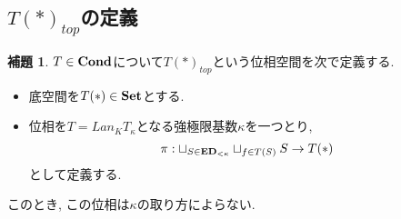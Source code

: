 \documentclass[dvipdfmx,a4paper,11pt]{report}
\theoremstyle{definition}
\newtheorem{lem}[thm]{補題}
\begin{document}
\subsection{$T(\ast)_{top}$の定義}
 \begin{tcolorbox}
 [colback = white, colframe = green!35!black, fonttitle = \bfseries,breakable = true]
\begin{lem} \cite{Sch19}
$T \in {\bf Cond}$について$T(\ast)_{top}$という位相空間を次で定義する.
\begin{itemize}
\item 底空間を$T(\ast) \in {\bf Set}$とする. 
\item 位相を$T = Lan_{K}T_{\kappa}$となる強極限基数$\kappa$を一つとり, 
$$
\pi : \sqcup_{S \in {\bf ED}_{<\kappa}}  \sqcup_{f \in T(S) }  S \to T(\ast)
$$
として定義する.
\end{itemize}
このとき, この位相は$\kappa$の取り方によらない. 
\end{lem}
 \end{tcolorbox}
\end{document}
